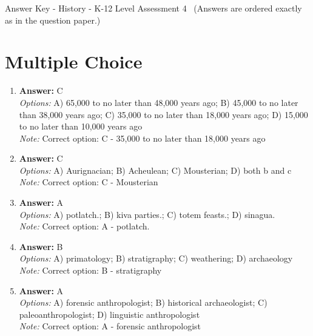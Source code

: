 \documentclass[12pt]{article}
\begin{document}
\begin{center}
Answer Key - History - K-12 Level Assessment 4 \
\small (Answers are ordered exactly as in the question paper.)
\end{center}

\section*{Multiple Choice}
\begin{enumerate}[label=\arabic*.]
\item \textbf{Answer:} C
\\ \textit{Options:} A) 65,000 to no later than 48,000 years ago; B) 45,000 to no later than 38,000 years ago; C) 35,000 to no later than 18,000 years ago; D) 15,000 to no later than 10,000 years ago
\\ \textit{Note:} Correct option: C - 35,000 to no later than 18,000 years ago
\item \textbf{Answer:} C
\\ \textit{Options:} A) Aurignacian; B) Acheulean; C) Mousterian; D) both b and c
\\ \textit{Note:} Correct option: C - Mousterian
\item \textbf{Answer:} A
\\ \textit{Options:} A) potlatch.; B) kiva parties.; C) totem feasts.; D) sinagua.
\\ \textit{Note:} Correct option: A - potlatch.
\item \textbf{Answer:} B
\\ \textit{Options:} A) primatology; B) stratigraphy; C) weathering; D) archaeology
\\ \textit{Note:} Correct option: B - stratigraphy
\item \textbf{Answer:} A
\\ \textit{Options:} A) forensic anthropologist; B) historical archaeologist; C) paleoanthropologist; D) linguistic anthropologist
\\ \textit{Note:} Correct option: A - forensic anthropologist
\end{enumerate}
\end{document}
